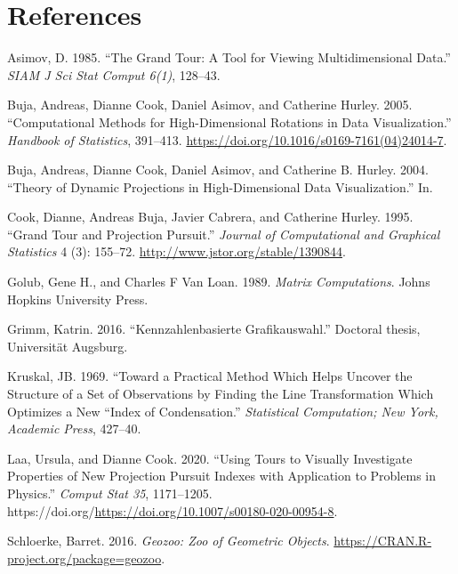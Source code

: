 \hypertarget{references}{%
\section*{References}\label{references}}

\hypertarget{refs}{}
\begin{CSLReferences}{1}{0}
\leavevmode{}%
Asimov, D. 1985. {``The Grand Tour: A Tool for Viewing Multidimensional Data.''} \emph{SIAM J Sci Stat Comput 6(1)}, 128--43.

\leavevmode{}%
Buja, Andreas, Dianne Cook, Daniel Asimov, and Catherine Hurley. 2005. {``Computational Methods for High-Dimensional Rotations in Data Visualization.''} \emph{Handbook of Statistics}, 391--413. \url{https://doi.org/10.1016/s0169-7161(04)24014-7}.

\leavevmode{}%
Buja, Andreas, Dianne Cook, Daniel Asimov, and Catherine B. Hurley. 2004. {``Theory of Dynamic Projections in High-Dimensional Data Visualization.''} In.

\leavevmode{}%
Cook, Dianne, Andreas Buja, Javier Cabrera, and Catherine Hurley. 1995. {``Grand Tour and Projection Pursuit.''} \emph{Journal of Computational and Graphical Statistics} 4 (3): 155--72. \url{http://www.jstor.org/stable/1390844}.

\leavevmode{}%
Golub, Gene H., and Charles F Van Loan. 1989. \emph{Matrix Computations}. Johns Hopkins University Press.

\leavevmode{}%
Grimm, Katrin. 2016. {``Kennzahlenbasierte Grafikauswahl.''} Doctoral thesis, Universit{ä}t Augsburg.

\leavevmode{}%
Kruskal, JB. 1969. {``Toward a Practical Method Which Helps Uncover the Structure of a Set of Observations by Finding the Line Transformation Which Optimizes a New ``Index of Condensation.''} \emph{Statistical Computation; New York, Academic Press}, 427--40.

\leavevmode{}%
Laa, Ursula, and Dianne Cook. 2020. {``Using Tours to Visually Investigate Properties of New Projection Pursuit Indexes with Application to Problems in Physics.''} \emph{Comput Stat 35}, 1171--1205. https://doi.org/\url{https://doi.org/10.1007/s00180-020-00954-8}.

\leavevmode{}%
Schloerke, Barret. 2016. \emph{Geozoo: Zoo of Geometric Objects}. \url{https://CRAN.R-project.org/package=geozoo}.

\end{CSLReferences}

